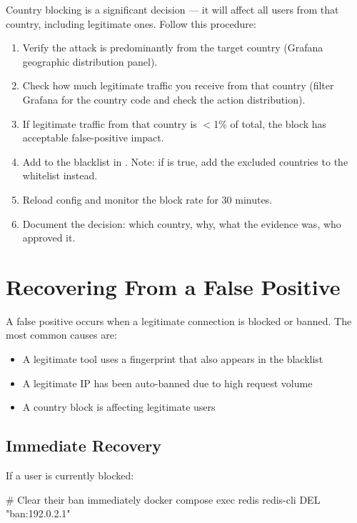 Country blocking is a significant decision — it will affect all users from that
country, including legitimate ones. Follow this procedure:

\begin{enumerate}
  \item Verify the attack is predominantly from the target country (Grafana
    geographic distribution panel).
  \item Check how much legitimate traffic you receive from that country
    (filter Grafana for the country code and check the action distribution).
  \item If legitimate traffic from that country is $<$1\% of total, the block
    has acceptable false-positive impact.
  \item Add to the blacklist in . Note: if
     is true, add the excluded countries
    to the whitelist instead.
  \item Reload config and monitor the block rate for 30 minutes.
  \item Document the decision: which country, why, what the evidence was, who
    approved it.
\end{enumerate}

\section{Recovering From a False Positive}

A false positive occurs when a legitimate connection is blocked or banned. The
most common causes are:
\begin{itemize}
  \item A legitimate tool uses a fingerprint that also appears in the blacklist
  \item A legitimate IP has been auto-banned due to high request volume
  \item A country block is affecting legitimate users
\end{itemize}

\subsection{Immediate Recovery}

If a user is currently blocked:

\begin{bashcode}
# Clear their ban immediately
docker compose exec redis redis-cli DEL "ban:192.0.2.1"
\end{bashcode}

